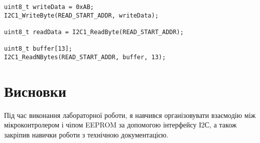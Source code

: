 \documentclass[oneside,14pt]{extarticle}
\begin{document}
\begin{normalsize}
{\begin{lstlisting}
uint8_t writeData = 0xAB;
I2C1_WriteByte(READ_START_ADDR, writeData);

uint8_t readData = I2C1_ReadByte(READ_START_ADDR);

uint8_t buffer[13];
I2C1_ReadNBytes(READ_START_ADDR, buffer, 13);\end{lstlisting}}
	
	\section*{Висновки}
	Під час виконання лабораторної роботи, я навчився організовувати взаємодію між мікроконтролером і чіпом EEPROM за допомогою інтерфейсу І2С, а також закріпив навички роботи з технічною документацією.
	    
\end{normalsize}
\end{document}
